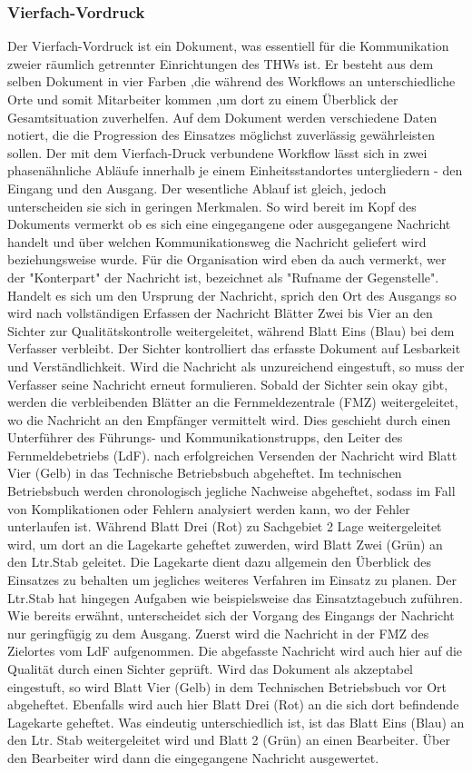\subsubsection{Vierfach-Vordruck}
Der Vierfach-Vordruck ist ein Dokument, was essentiell für die Kommunikation zweier räumlich getrennter Einrichtungen des THWs ist. Er besteht aus dem selben Dokument in vier Farben ,die während des Workflows an unterschiedliche Orte und somit Mitarbeiter kommen ,um dort zu einem Überblick der Gesamtsituation zuverhelfen. Auf dem Dokument werden verschiedene Daten notiert, die die Progression des Einsatzes möglichst zuverlässig gewährleisten sollen. Der mit dem Vierfach-Druck verbundene Workflow lässt sich in zwei phasenähnliche Abläufe innerhalb je einem Einheitsstandortes untergliedern - den Eingang und den Ausgang. Der wesentliche Ablauf ist gleich, jedoch unterscheiden sie sich in geringen Merkmalen. So wird bereit im Kopf des Dokuments vermerkt ob es sich eine eingegangene oder ausgegangene Nachricht handelt und über welchen Kommunikationsweg die Nachricht geliefert wird beziehungsweise wurde. Für die Organisation wird eben da auch vermerkt, wer der "Konterpart" der Nachricht ist, bezeichnet als "Rufname der Gegenstelle". Handelt es sich um den Ursprung der Nachricht, sprich den Ort des Ausgangs so wird nach vollständigen Erfassen der Nachricht Blätter Zwei bis Vier an den Sichter zur Qualitätskontrolle weitergeleitet, während Blatt Eins (Blau) bei dem Verfasser verbleibt. Der Sichter kontrolliert das erfasste Dokument auf Lesbarkeit und Verständlichkeit. Wird die Nachricht als unzureichend eingestuft, so muss der Verfasser seine Nachricht erneut formulieren. Sobald der Sichter sein okay gibt, werden die verbleibenden Blätter an die Fernmeldezentrale (FMZ) weitergeleitet, wo die Nachricht an den Empfänger vermittelt wird. Dies geschieht durch einen Unterführer des Führungs- und Kommunikationstrupps, den Leiter des Fernmeldebetriebs (LdF). nach erfolgreichen Versenden der Nachricht wird Blatt Vier (Gelb) in das Technische Betriebsbuch abgeheftet. Im technischen Betriebsbuch werden chronologisch jegliche Nachweise abgeheftet, sodass im Fall von Komplikationen oder Fehlern analysiert werden kann, wo der Fehler unterlaufen ist. Während Blatt Drei (Rot) zu Sachgebiet 2 Lage weitergeleitet wird, um dort an die Lagekarte geheftet zuwerden, wird Blatt Zwei (Grün) an den Ltr.Stab geleitet. Die Lagekarte dient dazu allgemein den Überblick des Einsatzes zu behalten um jegliches weiteres Verfahren im Einsatz zu planen. Der Ltr.Stab hat hingegen Aufgaben wie beispielsweise das Einsatztagebuch zuführen. Wie bereits erwähnt, unterscheidet sich der Vorgang des Eingangs der Nachricht nur geringfügig zu dem Ausgang. Zuerst wird die Nachricht in der FMZ des Zielortes vom LdF aufgenommen. Die abgefasste Nachricht wird auch hier auf die Qualität durch einen Sichter geprüft. Wird das Dokument als akzeptabel eingestuft, so wird Blatt Vier (Gelb) in dem Technischen Betriebsbuch vor Ort abgeheftet. Ebenfalls wird auch hier Blatt Drei (Rot) an die sich dort befindende Lagekarte geheftet. Was eindeutig unterschiedlich ist, ist das Blatt Eins (Blau) an den Ltr. Stab weitergeleitet wird und Blatt 2 (Grün) an einen Bearbeiter. Über den Bearbeiter wird dann die eingegangene Nachricht ausgewertet. 